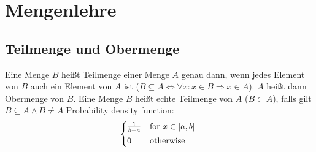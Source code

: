 \section{Mengenlehre}
\subsection*{Teilmenge und Obermenge}
Eine Menge $B$ heißt Teilmenge einer Menge $A$ genau dann,
wenn jedes Element von $B$ auch ein Element von $A$ ist ($B\subseteq A\Leftrightarrow\forall x:x\in B\Rightarrow x\in A$).
$A$ heißt dann Obermenge von $B$. Eine Menge $B$ heißt echte Teilmenge von $A$ ($B\subset A$), falls gilt $B\subseteq A\wedge B\neq A$
Probability density function:
\[
    \begin{cases*}
        \frac{1}{b-a} & for $x\in[a,b]$ \\
        0 & otherwise \\
    \end{cases*}
\]